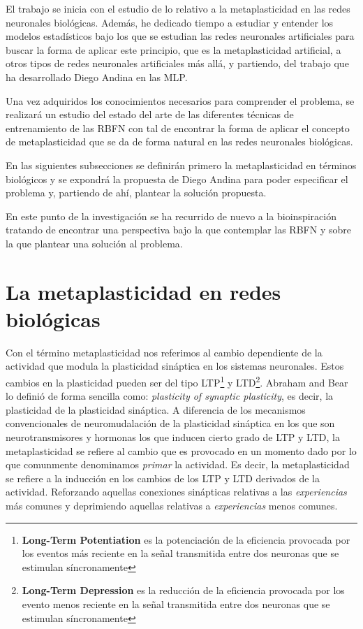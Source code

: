 \documentclass[10pt,a4paper]{report}
\begin{document}
El trabajo se inicia con el estudio de lo relativo a la metaplasticidad en las redes neuronales biológicas. Además, he dedicado tiempo a estudiar y entender los modelos estadísticos bajo los que se estudian las redes neuronales artificiales para buscar la forma de aplicar este principio, que es la metaplasticidad artificial, a otros tipos de redes neuronales artificiales más allá, y partiendo, del trabajo que ha desarrollado Diego Andina en las MLP\citep{Andina2009}.

Una vez adquiridos los conocimientos necesarios para comprender el problema, se realizará un estudio del estado del arte de las diferentes técnicas de entrenamiento de las RBFN con tal de encontrar la forma de aplicar el concepto de metaplasticidad que se da de forma natural en las redes neuronales biológicas.

En las siguientes subsecciones se definirán primero la metaplasticidad en términos biológicos y se expondrá la propuesta de Diego Andina para poder especificar el problema y, partiendo de ahí, plantear la solución propuesta. 

En este punto de la investigación se ha recurrido de nuevo a la bioinspiración tratando de encontrar una perspectiva bajo la que contemplar las RBFN y sobre la que plantear una solución al problema. 

\section{La metaplasticidad en redes biológicas}
Con el término metaplasticidad nos referimos al cambio dependiente de la actividad que modula la plasticidad sináptica en los sistemas neuronales. Estos cambios en la plasticidad pueden ser del tipo LTP\footnote{\textbf{Long-Term Potentiation} es la potenciación de la eficiencia provocada por los eventos más reciente en la señal transmitida entre dos neuronas que se estimulan síncronamente} y LTD\footnote{\textbf{Long-Term Depression} es la reducción de la eficiencia provocada por los evento menos reciente en la señal transmitida entre dos neuronas que se estimulan síncronamente}. Abraham and Bear lo definió de forma sencilla como: \textit{plasticity of synaptic plasticity}, es decir, la plasticidad de la plasticidad sináptica. A diferencia de los mecanismos convencionales de neuromudalación de la plasticidad sináptica en los que son neurotransmisores y hormonas los que inducen cierto grado de LTP y LTD, la metaplasticidad se refiere al cambio que es provocado en un momento dado por lo que comunmente denominamos \textit{primar} la actividad. Es decir, la metaplasticidad se refiere a la inducción en los cambios de los LTP y LTD derivados de la actividad. Reforzando aquellas conexiones sinápticas relativas a las \textit{experiencias} más comunes y deprimiendo aquellas relativas a \textit{experiencias} menos comunes.
\end{document}
